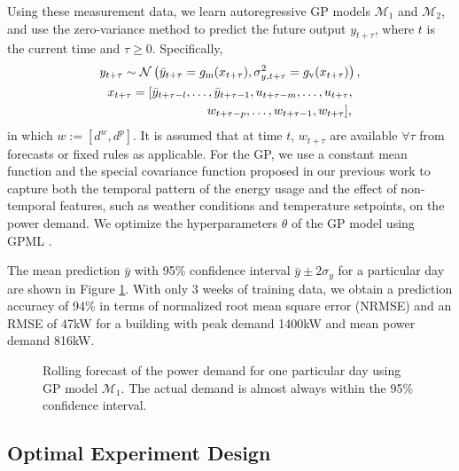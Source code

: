 Using these measurement data, we learn autoregressive GP models \(\mathcal{M}_1\) and \(\mathcal{M}_2\), and use the zero-variance method to predict the future output \(y_{t+\tau}\), where $t$ is the current time and \( \tau \ge 0\).
Specifically,
\begin{gather}
\label{eq:dpc:prediction}
y_{t+\tau} \sim \operatorname*{\mathcal{N}}\left(\bar{y}_{t+\tau} = g_{\mathrm m}(x_{t+\tau}), \sigma^2_{y, t+\tau} = g_{\mathrm v}(x_{t+\tau})\right), \\
x_{t + \tau} = [\bar y_{t+ \tau-l}, \dots, \bar y_{t+ \tau-1}, u_{t+ \tau-m}, \dots, u_{t+ \tau}, \nonumber \\
\qquad\qquad\qquad\qquad  w_{t+ \tau-p}, \dots, w_{t+ \tau-1}, w_{t+ \tau}]\text, \nonumber
\end{gather}
in which \(w:=[d^w, d^p]\).
It is assumed that at time \(t\), \(w_{t+\tau}\) are available \(\forall \tau \) from forecasts or fixed rules as applicable.
For the GP, we use a constant mean function and the special covariance function proposed in our previous work \cite{nghiemetal16gp} to capture both the temporal pattern of the energy usage and the effect of non-temporal features, such as weather conditions and temperature setpoints, on the power demand.
We optimize the hyperparameters \(\theta\) %
of the GP model using GPML \cite{Rasmussen2010}.

The mean prediction \(\bar{y}\) with 95\% confidence interval \(\bar{y} \pm 2\sigma_y\) for a particular day are shown in Figure \ref{F:prediction}. With only 3 weeks of training data, we obtain a prediction accuracy of 94\% in terms of normalized root mean square error (NRMSE) and an RMSE of 47kW for a building with peak demand 1400kW and mean power demand 816kW.

\begin{figure}[t]
	\centering
	\setlength{} 
	\setlength{}
	
	\caption{Rolling forecast of the power demand for one particular day using GP model \(\mathcal{M}_1\). The actual demand is almost always within the 95\% confidence interval.}
	\label{F:prediction}
\end{figure}
\fi

\subsection{Optimal Experiment Design} %
\label{sec:modeling:oed}

